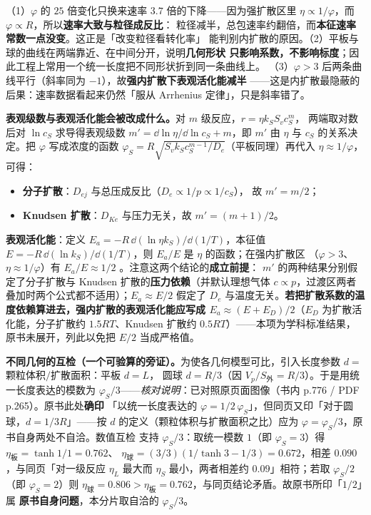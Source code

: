 \begin{infer}
（1）$\varphi$ 的 $25$ 倍变化只换来速率 $3.7$ 倍的下降——因为强扩散区里
$\eta\propto1/\varphi$，而 $\varphi\propto R$，所以\textbf{速率大致与粒径成反比}：
粒径减半，总包速率约翻倍，而\textbf{本征速率常数一点没变}。这正是「改变粒径看转化率」
能判别内扩散的原因。（2）平板与球的曲线在两端靠近、在中间分开，说明\textbf{几何形状
只影响系数，不影响标度}；因此工程上常用一个统一长度把不同形状折到同一条曲线上。
（3）$\varphi>3$ 后两条曲线平行（斜率同为 $-1$），故\textbf{强内扩散下表观活化能减半}
——这是内扩散最隐蔽的后果：速率数据看起来仍然「服从 Arrhenius 定律」，只是斜率错了。
\end{infer}

\textbf{表观级数与表观活化能会被改成什么。}对 $m$ 级反应，$r=\eta k_SS_vc_S^m$，
两端取对数后对 $\ln c_S$ 求导得表观级数 $m'=\dd\ln\eta/\dd\ln c_S+m$，即 $m'$ 由
$\eta$ 与 $c_S$ 的关系决定。把 $\varphi$ 写成浓度的函数
$\varphi_S=R\sqrt{S_vk_Sc_S^{m-1}/D_e}$（平板同理）再代入 $\eta\approx1/\varphi$，
可得：

\begin{itemize}
\item \textbf{分子扩散}：$D_{ej}$ 与总压成反比（$D_e\propto1/p\propto1/c_S$），
故 $m'=m/2$；
\item \textbf{Knudsen 扩散}：$D_{Ke}$ 与压力无关，故 $m'=(m+1)/2$。
\end{itemize}

\textbf{表观活化能}：定义 $E_a=-R\,\dd(\ln\eta k_S)/\dd(1/T)$，本征值
$E=-R\,\dd(\ln k_S)/\dd(1/T)$，则 $E_a/E$ 是 $\eta$ 的函数；在强内扩散区
（$\varphi>3$、$\eta\approx1/\varphi$）有 $E_a/E\approx1/2$
。注意这两个结论的\textbf{成立前提}：
$m'$ 的两种结果分别假定了分子扩散与 Knudsen 扩散的\textbf{压力依赖}（并默认理想气体
$c\propto p$，过渡区两者叠加时两个公式都不适用）；$E_a\approx E/2$ 假定了
$D_e$ 与温度无关。\textbf{若把扩散系数的温度依赖算进去，强内扩散的表观活化能应写成
$E_a\approx(E+E_D)/2$}（$E_D$ 为扩散活化能，分子扩散约 $1.5RT$、Knudsen 扩散约
$0.5RT$）——本项为学科标准结果，原书未展开，列此以免把 $E/2$ 当成严格值。

\textbf{不同几何的互检（一个可验算的旁证）。}为使各几何模型可比，引入长度参数
$d=$颗粒体积$/$扩散面积：平板 $d=L$，
圆球 $d=R/3$（因 $V_p/S_{\text{外}}=R/3$）。于是用统一长度表达的模数为
$\varphi_S/3$——\emph{核对说明}：已对照原页面图像（书内 p.776 / PDF p.265）。原书此处\textbf{确印}
「以统一长度表达的 $\varphi=1/2\,\varphi_S$」，但同页又印「对于圆球，$d=1/3R$」——按 $d$
的定义（颗粒体积与扩散面积之比）应为 $\varphi=\varphi_S/3$，原书自身两处不自洽。数值互检
支持 $\varphi_S/3$：取统一模数 $1$（即 $\varphi_S=3$）得 $\eta_{\text{板}}=\tanh 1/1=0.762$、
$\eta_{\text{球}}=(3/3)(1/\tanh 3-1/3)=0.672$，相差 $0.090$，与同页「对一级反应 $\eta_L$
最大而 $\eta_S$ 最小，两者相差约 $0.09$」相符；若取 $\varphi_S/2$（即 $\varphi_S=2$）则
$\eta_{\text{球}}=0.806>\eta_{\text{板}}=0.762$，与同页结论矛盾。故原书所印「$1/2$」属
\textbf{原书自身问题}，本分片取自洽的 $\varphi_S/3$。

